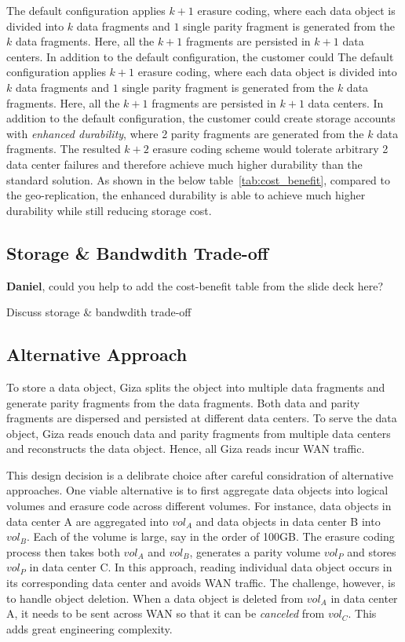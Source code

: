 The default configuration applies $k+1$ erasure coding, where each data object is divided into $k$ data fragments and $1$ single parity fragment is generated from the $k$ data fragments. Here, all the $k+1$ fragments are persisted in $k+1$ data centers. In addition to the default configuration, the customer could 
The default configuration applies $k+1$ erasure coding, where each data object is divided into $k$ data fragments and $1$ single parity fragment is generated from the $k$ data fragments. Here, all the $k+1$ fragments are persisted in $k+1$ data centers. In addition to the default configuration, the customer could create storage accounts with {\em enhanced durability}, where 2 parity fragments are generated from the $k$ data fragments. The resulted $k+2$ erasure coding scheme would tolerate arbitrary 2 data center failures and therefore achieve much higher durability than the standard solution. As shown in the below table~\ref{tab:cost_benefit}, compared to the geo-replication, the enhanced durability is able to achieve much higher durability while still reducing storage cost.

\subsection{Storage & Bandwdith Trade-off}

{\bf Daniel}, could you help to add the cost-benefit table from the slide deck here?

Discuss storage & bandwdith trade-off

\subsection{Alternative Approach}

To store a data object, Giza splits the object into multiple data fragments and generate parity fragments from the data fragments. Both data and parity fragments are dispersed and persisted at different data centers. To serve the data object, Giza reads enouch data and parity fragments from multiple data centers and reconstructs the data object. Hence, all Giza reads incur WAN traffic.

This design decision is a delibrate choice after careful considration of alternative approaches. One viable alternative is to first aggregate data objects into logical volumes and erasure code across different volumes. For instance, data objects in data center A are aggregated into $vol_A$ and data objects in data center B into $vol_B$. Each of the volume is large, say in the order of 100GB. The erasure coding process then takes both $vol_A$ and $vol_B$,  generates a parity volume $vol_P$ and stores $vol_P$ in data center C. In this approach, reading individual data object occurs in its corresponding data center and avoids WAN traffic. The challenge, however, is to handle object deletion. When a data object is deleted from $vol_A$ in data center A, it needs to be sent across WAN so that it can be {\em canceled} from $vol_C$. This adds great engineering complexity.

